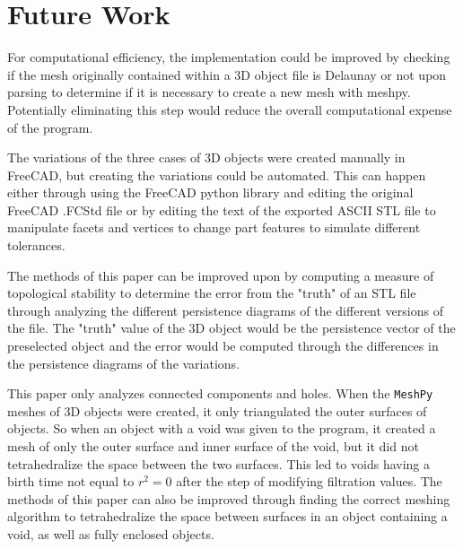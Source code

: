\documentclass[ma]{uncgdissertationexp}
\theoremstyle{plain}
\theoremstyle{definition}
\theoremstyle{remark}
\begin{document}
\section{Future Work}
\par For computational efficiency, the implementation could be improved by checking if the mesh originally contained within a 3D object file is Delaunay or not upon parsing to determine if it is necessary to create a new mesh with meshpy. Potentially eliminating this step would reduce the overall computational expense of the program.
\par The variations of the three cases of 3D objects were created manually in FreeCAD, but creating the variations could be automated. This can happen either through using the FreeCAD python library and editing the original FreeCAD .FCStd file or by editing the text of the exported ASCII STL file to manipulate facets and vertices to change part features to simulate different tolerances.
\par The methods of this paper can be improved upon by computing a measure of topological stability to determine the error from the "truth" of an STL file through analyzing the different persistence diagrams of the different versions of the file. The "truth" value of the 3D object would be the persistence vector of the preselected object and the error would be computed through the differences in the persistence diagrams of the variations.
\par This paper only analyzes connected components and holes. When the \verb"MeshPy" meshes of 3D objects were created, it only triangulated the outer surfaces of objects. So when an object with a void was given to the program, it created a mesh of only the outer surface and inner surface of the void, but it did not tetrahedralize the space between the two surfaces. This led to voids having a birth time not equal to $r^{2}=0$ after the step of modifying filtration values. The methods of this paper can also be improved through finding the correct meshing algorithm to tetrahedralize the space between surfaces in an object containing a void, as well as fully enclosed objects.



\backmatter
\end{document}
